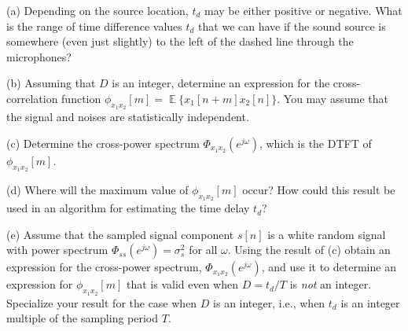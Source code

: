 \documentclass[12pt]{report}
\DeclareMathOperator{\E}{\mathbb{E}} %
\begin{document}
\begin{description}
\item{(a)}  Depending on the source location, $t_{d}$ may be either positive or negative. What is the range of time difference values $t_d$ that we can have if the sound source is somewhere (even just slightly) to the left of the dashed line through the microphones?
\item{(b)} Assuming that $D$ is an integer, determine an expression for the cross-correlation function $\phi_{x_1x_2}[m]=\E\{x_1[n+m]x_2[n]\}$. You may assume that the signal and noises are statistically independent.
\item{(c)} Determine the cross-power spectrum $\Phi_{x_1x_2}(e^{j\omega})$, which is the DTFT of $\phi_{x_1x_2}[m]$.
\item{(d)}  Where will the maximum value of $\phi_{x_1x_2}[m]$ occur?  How could this result be used in an algorithm for estimating the time delay $t_d$?
\item{(e)}  Assume that the sampled signal component $s[n]$ is a white random signal with  power spectrum $\Phi_{ss}(e^{j\omega}) = \sigma_s^2$ for all $\omega$. Using the result of (c) obtain an expression for the cross-power spectrum, $\Phi_{x_1x_2}(e^{j\omega})$, and use it to determine an expression for $\phi_{x_1x_2}[m]$ that is valid even when $D=t_d/T$ is \emph{not} an integer. Specialize your result for the case when $D$ is an integer, i.e., when $t_d$ is an integer multiple of the sampling period $T$.
\end{description}

\newpage

\begin{center}
\end{center}
\\


\end{document}
